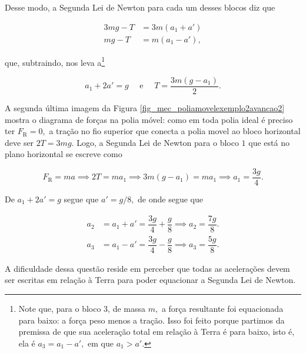 \begin{exemplo}
Desse modo, a Segunda Lei de Newton para cada um desses blocos diz que

\begin{align}
    3mg - T &= 3 m (a_1 + a') \nonumber \\
    mg-T &=  m (a_1 - a'), \nonumber
\end{align}

\noindent que, subtraindo, nos leva a\footnote{Note que, para o bloco $3$, de massa $m,$ a força resultante foi equacionada para baixo: a força peso menos a tração. Isso foi feito porque partimos da premissa de que sua aceleração total em relação à Terra é para baixo, isto é, ela é $a_3=a_1-a',$ em que $a_1>a'.$}

$$ a_1+2a' = g \quad \text{ e } \quad T = \dfrac{3m(g-a_1)}{2}.$$

A segunda última imagem da Figura \ref{fig_mec_poliamovelexemplo2avancao2} mostra o diagrama de forças na polia móvel: como em toda polia ideal é preciso ter $F_\text{R}=0,$ a tração no fio superior que conecta a polia movel ao bloco horizontal deve ser $2T = 3mg.$ Logo, a Segunda Lei de Newton para o bloco $1$ que está no plano horizontal se escreve como

$$ F_\text{R} = ma \implies 2T = ma_1 \implies  3m(g-a_1) = ma_1 \implies \boxed{a_1 = \dfrac{3g}{4} .}$$

De $a_1+2a' = g$ segue que $a'= g/8,$ de onde segue que

\begin{align}
    a_2 &= a_1 + a' = \dfrac{3g}{4} + \dfrac{g}{8} \implies \boxed{ a_2 = \dfrac{7g}{8}.} \nonumber \\
    a_3 &= a_1 - a' =\dfrac{3g}{4} - \dfrac{g}{8} \implies \boxed{ a_3 = \dfrac{5g}{8}.} \nonumber
\end{align}


A dificuldade dessa questão reside em perceber que todas as acelerações devem ser escritas em relação à Terra para poder equacionar a Segunda Lei de Newton.

\end{exemplo}
\vspace{0.3cm}







